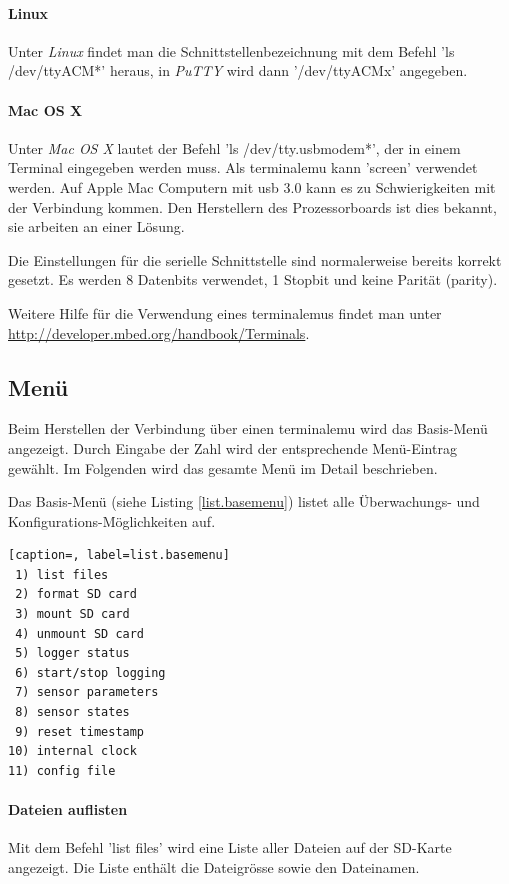 \paragraph{Linux} Unter \emph{Linux} findet man die Schnittstellenbezeichnung mit dem Befehl 'ls /dev/ttyACM*' heraus, in \emph{PuTTY} wird dann '/dev/ttyACMx' angegeben. 

\paragraph{Mac OS X} Unter \emph{Mac OS X} lautet der Befehl 'ls /dev/tty.usbmodem*', der in einem Terminal eingegeben werden muss. Als \gls{terminalemu} kann 'screen' verwendet werden. Auf Apple Mac Computern mit \gls{usb} 3.0 kann es zu Schwierigkeiten mit der Verbindung kommen. Den Herstellern des Prozessorboards ist dies bekannt, sie arbeiten an einer Lösung.

Die Einstellungen für die serielle Schnittstelle sind normalerweise bereits korrekt gesetzt. Es werden 8 Datenbits verwendet, 1 Stopbit und keine Parität (parity).

Weitere Hilfe für die Verwendung eines \gls{terminalemu}s findet man unter \url{http://developer.mbed.org/handbook/Terminals}.



\subsection{Menü}\label{ssec.menu}
Beim Herstellen der Verbindung über einen \gls{terminalemu} wird das Basis-Menü angezeigt. Durch Eingabe der Zahl wird der entsprechende Menü-Eintrag gewählt. Im Folgenden wird das gesamte Menü im Detail beschrieben.

Das Basis-Menü (siehe Listing \ref{list.basemenu}) listet alle Überwachungs- und Konfigurations-Möglichkeiten auf. 

\begin{lstlisting}[caption=, label=list.basemenu]
 1) list files
 2) format SD card
 3) mount SD card
 4) unmount SD card
 5) logger status
 6) start/stop logging
 7) sensor parameters
 8) sensor states
 9) reset timestamp
10) internal clock
11) config file
\end{lstlisting}

\paragraph{Dateien auflisten} Mit dem Befehl 'list files' wird eine Liste aller Dateien auf der SD-Karte angezeigt. Die Liste enthält die Dateigrösse sowie den Dateinamen.


